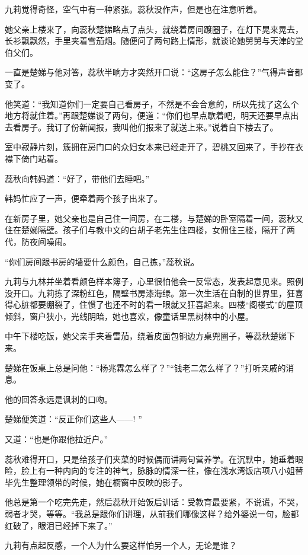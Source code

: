 \par 九莉觉得奇怪，空气中有一种紧张。蕊秋没作声，但是也在注意听着。
\par 她父亲上楼来了，向蕊秋楚娣略点了点头，就绕着房间踱圈子，在灯下晃来晃去，长衫飘飘然，手里夹着雪茄烟。随便问了两句路上情形，就谈论她舅舅与天津的堂伯父们。
\par 一直是楚娣与他对答，蕊秋半晌方才突然开口说：“这房子怎么能住？”气得声音都变了。
\par 他笑道：“我知道你们一定要自己看房子，不然是不会合意的，所以先找了这么个地方将就住着。”再跟楚娣谈了两句，便道：“你们也早点歇着吧，明天还要早点出去看房子。我订了份新闻报，我叫他们报来了就送上来。”说着自下楼去了。
\par 室中寂静片刻，簇拥在房门口的众妇女本来已经走开了，碧桃又回来了，手抄在衣襟下倚门站着。
\par 蕊秋向韩妈道：“好了，带他们去睡吧。”
\par 韩妈忙应了一声，便牵着两个孩子出来了。
\par 在新房子里，她父亲也是自己住一间房，在二楼，与楚娣的卧室隔着一间，蕊秋又住在楚娣隔壁。孩子们与教中文的白胡子老先生住四楼，女佣住三楼，隔开了两代，防夜间噪闹。
\par “你们房间跟书房的墙要什么颜色，自己拣，”蕊秋说。
\par 九莉与九林并坐着看颜色样本簿子，心里很怕他会一反常态，发表起意见来。照例没开口。九莉拣了深粉红色，隔壁书房漆海绿。第一次生活在自制的世界里，狂喜得心脏都要绷裂了，住惯了也还不时的看一眼就又狂喜起来。四楼“阁楼式”的屋顶倾斜，窗户狭小，光线阴暗，她也喜欢，像童话里黑树林中的小屋。
\par 中午下楼吃饭，她父亲手夹着雪茄，绕着皮面包铜边方桌兜圈子，等蕊秋楚娣下来。
\par 楚娣在饭桌上总是问他：“杨兆霖怎么样了？”“钱老二怎么样了？”打听亲戚的消息。
\par 他的回答永远是讽刺的口吻。
\par 楚娣便笑道：“反正你们这些人——! ”
\par 又道：“也是你跟他拉近户。”
\par 蕊秋难得开口，只是给孩子们夹菜的时候偶而讲两句营养学。在沉默中，她垂着眼睑，脸上有一种内向的专注的神气，脉脉的情深一往，像在浅水湾饭店项八小姐替毕先生整理领带的时候，她在橱窗中反映的影子。
\par 他总是第一个吃完先走，然后蕊秋开始饭后训话：受教育最要紧，不说谎，不哭，弱者才哭，等等。“我总是跟你们讲理，从前我们哪像这样？给外婆说一句，脸都红破了，眼泪已经掉下来了。”
\par 九莉有点起反感，一个人为什么要这样怕另一个人，无论是谁？
